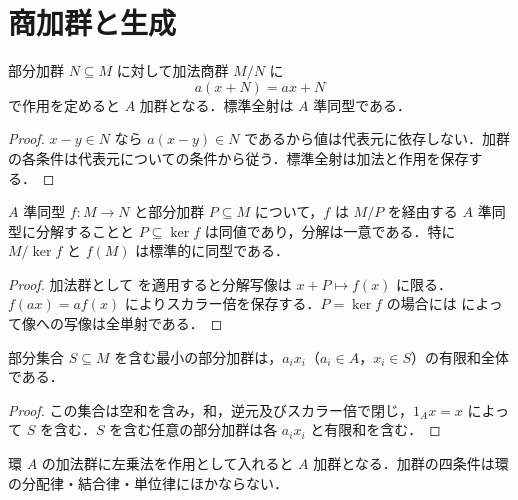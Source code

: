 \section{商加群と生成}
\begin{prop}[商加群]
部分加群 $N\subseteq M$ に対して加法商群 $M/N$ に
\[
 a(x+N)=ax+N
\]
で作用を定めると $A$ 加群となる．標準全射は $A$ 準同型である．
\end{prop}
\begin{proof}
$x-y\in N$ なら $a(x-y)\in N$ であるから値は代表元に依存しない．加群の各条件は代表元についての条件から従う．標準全射は加法と作用を保存する．
\end{proof}
\begin{prop}[加群準同型の第一同型定理]
$A$ 準同型 $f:M\to N$ と部分加群 $P\subseteq M$ について，$f$ は $M/P$ を経由する $A$ 準同型に分解することと $P\subseteq\ker f$ は同値であり，分解は一意である．特に $M/\ker f$ と $f(M)$ は標準的に同型である．
\end{prop}
\begin{proof}
加法群として  を適用すると分解写像は $x+P\mapsto f(x)$ に限る．$f(ax)=af(x)$ によりスカラー倍を保存する．$P=\ker f$ の場合には  によって像への写像は全単射である．
\end{proof}
\begin{prop}[生成部分加群]
部分集合 $S\subseteq M$ を含む最小の部分加群は，$a_ix_i$（$a_i\in A$，$x_i\in S$）の有限和全体である．
\end{prop}
\begin{proof}
この集合は空和を含み，和，逆元及びスカラー倍で閉じ，$1_Ax=x$ によって $S$ を含む．$S$ を含む任意の部分加群は各 $a_ix_i$ と有限和を含む．
\end{proof}
\begin{prop}[環自身の左加群]
環 $A$ の加法群に左乗法を作用として入れると $A$ 加群となる．加群の四条件は環の分配律・結合律・単位律にほかならない．
\end{prop}
